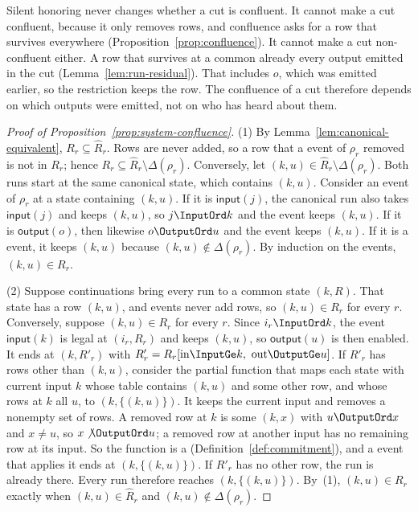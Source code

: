 Silent honoring never changes whether a cut is confluent.  It cannot make a
cut confluent, because it only removes rows, and confluence asks for a row
that survives everywhere (Proposition~\ref{prop:confluence}).  It cannot make
a cut non-confluent either.  A row that survives at a common \indesc already
\outrel every output emitted in the cut (Lemma~\ref{lem:run-residual}).  That
includes $o$, which was emitted earlier, so the restriction keeps the row.
The confluence of a cut therefore depends on which outputs were emitted,
not on who has heard about them.

\begin{proof}[Proof of Proposition~\ref{prop:system-confluence}]
(1) By Lemma~\ref{lem:canonical-equivalent}, $R_r\subseteq\widehat R_r$.
Rows are never added, so a row that a \commitment event of $\rho_r$ removed is
not in $R_r$; hence $R_r\subseteq\widehat R_r\setminus\Delta(\rho_r)$.
Conversely, let $(k,u)\in\widehat R_r\setminus\Delta(\rho_r)$.  Both runs
start at the same canonical state, which contains $(k,u)$.  Consider an event of
$\rho_r$ at a state containing $(k,u)$.  If it is $\mathsf{input}(j)$, the
canonical run also takes $\mathsf{input}(j)$ and keeps $(k,u)$, so
$j\InputOrd k$ and the event keeps $(k,u)$.  If it is $\mathsf{output}(o)$,
then likewise $o\OutputOrd u$ and the event keeps $(k,u)$.  If it is a
\commitment event, it keeps $(k,u)$ because $(k,u)\notin\Delta(\rho_r)$.  By
induction on the events, $(k,u)\in R_r$.

(2) Suppose continuations bring every run to a common state $(k,R)$.  That
state has a row $(k,u)$, and events never add rows, so $(k,u)\in R_r$ for every
$r$.  Conversely, suppose $(k,u)\in R_r$ for every $r$.  Since
$i_r\InputOrd k$, the event $\mathsf{input}(k)$ is legal at $(i_r,R_r)$ and
keeps $(k,u)$, so $\mathsf{output}(u)$ is then enabled.  It ends at
$(k,R'_r)$ with $R'_r=R_r[\mathrm{in}\InputGe k,\ \mathrm{out}\OutputGe u]$.
If $R'_r$ has rows other than $(k,u)$, consider the partial function that maps
each state with current input $k$ whose table contains $(k,u)$ and some other
row, and whose rows at $k$ all \outrelbase $u$, to $(k,\{(k,u)\})$.  It keeps
the current input and removes a nonempty set of rows.  A removed row at $k$ is some $(k,x)$ with
$u\OutputOrd x$ and $x\neq u$, so $x\not\OutputOrd u$; a removed row at
another input has no remaining row at its input.  So the function is a
\commitment (Definition~\ref{def:commitment}), and a \commitment event that
applies it ends at $(k,\{(k,u)\})$.  If $R'_r$ has no other row, the run is
already there.  Every run therefore reaches $(k,\{(k,u)\})$.  By~(1),
$(k,u)\in R_r$ exactly when $(k,u)\in\widehat R_r$ and
$(k,u)\notin\Delta(\rho_r)$.
\end{proof}

